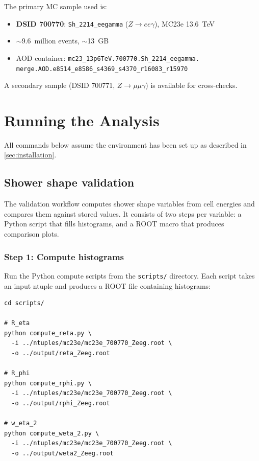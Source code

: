 \documentclass[12pt,a4paper]{article}
\begin{document}
The primary MC sample used is:
\begin{itemize}[leftmargin=2em]
  \item \textbf{DSID 700770}:
    \texttt{Sh\_2214\_eegamma} ($Z\to ee\gamma$), MC23e 13.6~TeV
  \item $\sim$9.6~million events, $\sim$13~GB
  \item AOD container: \texttt{mc23\_13p6TeV.700770.Sh\_2214\_eegamma.%
    merge.AOD.e8514\_e8586\_s4369\_s4370\_r16083\_r15970}
\end{itemize}

A secondary sample (DSID 700771, $Z\to\mu\mu\gamma$) is available for
cross-checks.

\section{Running the Analysis}
\label{sec:running}

All commands below assume the environment has been set up as described
in \cref{sec:installation}.

\subsection{Shower shape validation}
\label{sec:running:validation}

The validation workflow computes shower shape variables from cell
energies and compares them against stored values. It consists of two
steps per variable: a Python script that fills histograms, and a ROOT
macro that produces comparison plots.

\subsubsection{Step 1: Compute histograms}

Run the Python compute scripts from the \texttt{scripts/} directory.
Each script takes an input ntuple and produces a ROOT file containing
histograms:

\begin{lstlisting}
cd scripts/

# R_eta
python compute_reta.py \
  -i ../ntuples/mc23e/mc23e_700770_Zeeg.root \
  -o ../output/reta_Zeeg.root

# R_phi
python compute_rphi.py \
  -i ../ntuples/mc23e/mc23e_700770_Zeeg.root \
  -o ../output/rphi_Zeeg.root

# w_eta_2
python compute_weta_2.py \
  -i ../ntuples/mc23e/mc23e_700770_Zeeg.root \
  -o ../output/weta2_Zeeg.root
\end{lstlisting}
\end{document}
